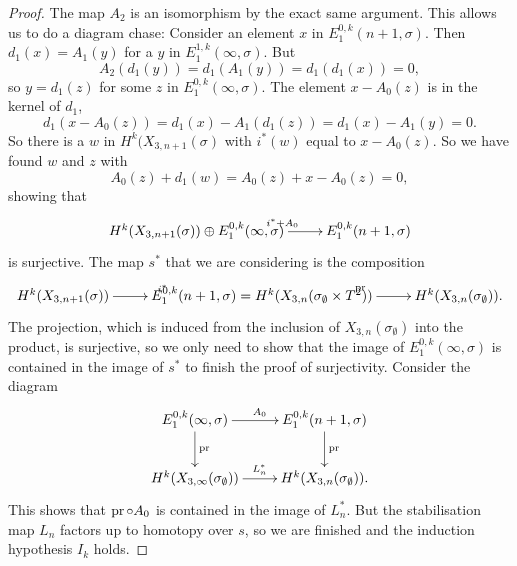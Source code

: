 \begin{proof}
The map $A_2$ is an isomorphism by the exact same argument.
This allows us to do a diagram chase: Consider an element $x$ in
$E_1^{0,k}(n+1,\sigma)$. Then $d_1(x) = A_1(y)$ for a $y$ in
$E_1^{1,k}(\infty,\sigma)$. But 
\[ A_2(d_1(y)) = d_1(A_1(y)) = d_1(d_1(x)) = 0, \]
so $y = d_1(z)$ for some $z$ in $E_1^{0,k}(\infty,\sigma)$. The
element $x - A_0(z)$ is in the kernel of $d_1$,
\[ d_1(x - A_0(z)) = d_1(x) - A_1(d_1(z)) = d_1(x) - A_1(y) = 0. \]
So there is a $w$ in $H^k(X_{3,n+1}(\sigma)$ with $i^*(w)$ equal to
$x-A_0(z)$. So we have found $w$ and $z$ with
\[ A_0(z) + d_1(w) = A_0(z) + x - A_0(z) = 0, \]
showing that
\[ \xymatrix{ H^k(X_{3,n+1}(\sigma)) \oplus E_1^{0,k}(\infty,\sigma)
  \ar[r]^{i^* + A_0} & E_1^{0,k}(n+1,\sigma) } \]  
is surjective. The map $s^*$ that we are considering is the
composition
\[ \xymatrix{ H^k(X_{3,n+1}(\sigma)) \ar[r]^{i^*} &
  E_1^{0,k}(n+1,\sigma) = H^k(X_{3,n}(\sigma_{\emptyset}\times T^2))
  \ar[r]^{\pr} & H^k(X_{3,n}(\sigma_{\emptyset})). } \]
The projection, which is induced from the inclusion of
$X_{3,n}(\sigma_{\emptyset})$ into the product, is surjective, so we
only need to show that the image of
$E_1^{0,k}(\infty,\sigma)$ is contained in the image of $s^*$ to
finish the proof of surjectivity. Consider the diagram
\[ \xymatrix{ E_1^{0,k}(\infty,\sigma) \ar[r]^{A_0} \ar[d]^{\pr}
  & E_1^{0,k}(n+1,\sigma) \ar[d]^{\pr} \\
  H^k(X_{3,\infty}(\sigma_{\emptyset})) \ar[r]^{L_n^*} &
  H^k(X_{3,n}(\sigma_{\emptyset})). } \] 
This shows that $\operatorname{pr}\circ A_0$ is contained in the image of
$L_n^*$. But the stabilisation map $L_n$ factors up to homotopy over
$s$, so we are finished and the induction hypothesis $I_k$ holds.
\end{proof}

